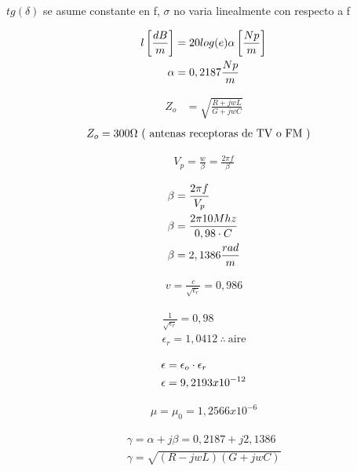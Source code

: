     $tg (\delta)$ se asume constante en f, $\sigma$ no varia linealmente con respecto a f

\begin{align}
    l \left[ \frac{dB}{m} \right] &= 20 log (e) \alpha \left[ \frac{Np}{m} \right] \\
    \alpha &= 0,2187 \frac{Np}{m} \notag
\end{align}    

\begin{align}
    Z_o &= \sqrt{ \frac{ R + jwL }  { G + jwC } }
    \label{ec 1}
\end{align}
\begin{align}
    Z_o &= 300 \Omega \   \text{( antenas receptoras de TV o FM )}   \notag
\end{align}


\begin{align}
    V_p = \frac{w}{\beta} = \frac{2 \pi f}{ \beta }
\end{align}

\begin{align}
    \beta &= \frac{ 2 \pi f } { V_p } \\
    \beta &= \frac{ 2 \pi 10Mhz } { 0,98 \cdot C } \notag \\
    \beta &= 2,1386 \frac{rad}{m} \notag
\end{align}

\begin{align*}
    v = \frac{c}{\sqrt{\epsilon_r}} = 0,986
\end{align*}

\begin{align*}
    \frac{1}{\sqrt{\epsilon_r}} = 0,98\\
    \epsilon_r = 1,0412 \  \therefore \ \text{aire}
\end{align*}

\begin{align}
    \epsilon &= \epsilon_o \cdot \epsilon_r \\
    \epsilon &= 9,2193x10^{-12} \notag
\end{align}

\begin{align*}
    \mu = \mu_0 = 1,2566x10^{-6}
\end{align*}

\begin{align}
    \gamma = \alpha + j\beta = 0,2187 + j2,1386 \\
    \gamma = \sqrt{ (R - jwL) (G + jwC) }
    \label{ec 2}
\end{align}

